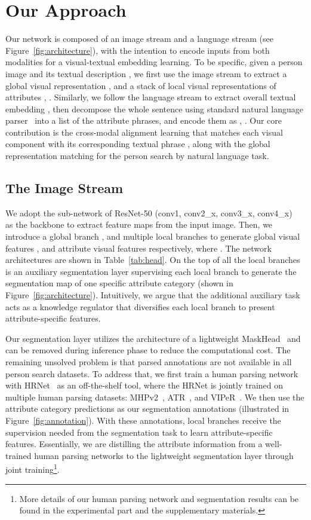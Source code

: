 \documentclass[runningheads]{llncs}
\begin{document}
\section{Our Approach}
Our network is composed of an image stream and a language stream (see Figure~\ref{fig:architecture}), with the intention to encode inputs from both modalities for a visual-textual embedding learning. To be specific, given a person image  and its textual description , we first use the image stream to extract a global visual representation , and a stack of local visual representations of  attributes , .
Similarly, we follow the language stream to extract overall textual embedding ,
then decompose the whole sentence using standard natural language parser~\cite{klein2003fast} into a list of the attribute phrases, and encode them as , . Our core contribution is the cross-modal alignment learning that matches each visual component  with its corresponding textual phrase , along with the global representation matching  for the person search by natural language task. 

\subsection{The Image Stream}
We adopt the sub-network of ResNet-50 (conv1, conv2\_x, conv3\_x, conv4\_x)~\cite{he2016deep} as the backbone to extract feature maps  from the input image. Then, we introduce a global branch , and multiple local branches  to generate global visual features , 
and attribute visual features  respectively, where . The network architectures are shown in Table~\ref{tab:head}. 
On the top of all the local branches is an auxiliary segmentation layer supervising each local branch to generate the segmentation map of one specific attribute category (shown in Figure~\ref{fig:architecture}). 
Intuitively, we argue that the additional auxiliary task acts as a knowledge regulator that diversifies each local branch to present attribute-specific features.

Our segmentation layer utilizes the architecture of a lightweight MaskHead~\cite{he2017mask} and can be removed during inference phase to reduce the computational cost. The remaining unsolved problem is that parsed annotations are not available in all person search datasets. 
To address that, we first train a human parsing network with HRNet~\cite{Sun_2019_CVPR} as an off-the-shelf tool, where the HRNet is jointly trained on multiple human parsing datasets: MHPv2~\cite{zhao2018understanding}, ATR~\cite{ATR}, and VIPeR~\cite{tan2019attention}.
We then use the attribute category predictions as our segmentation annotations (illustrated in Figure~\ref{fig:annotation}). With these annotations, local branches receive the supervision needed from the segmentation task to learn attribute-specific features. 
Essentially, we are distilling the attribute information from a well-trained human parsing networks to the lightweight segmentation layer through joint training\footnote[1]{More details of our human parsing network and segmentation results can be found in the experimental part and the supplementary materials.}.
\end{document}
